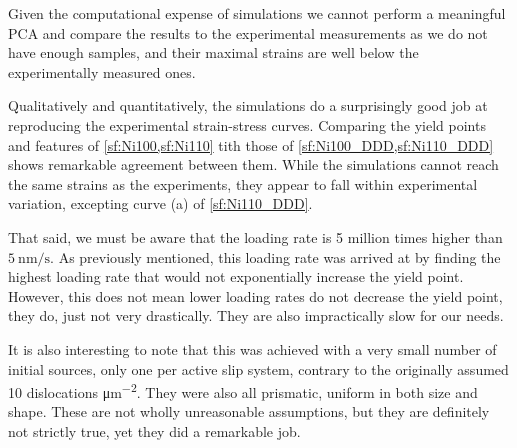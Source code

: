 Given the computational expense of simulations we cannot perform a meaningful PCA and compare the results to the experimental measurements as we do not have enough samples, and their maximal strains are well below the experimentally measured ones.

Qualitatively and quantitatively, the simulations do a surprisingly good job at reproducing the experimental strain-stress curves. Comparing the yield points and features of \cref{sf:Ni100,sf:Ni110} tith those of \cref{sf:Ni100_DDD,sf:Ni110_DDD} shows remarkable agreement between them. While the simulations cannot reach the same strains as the experiments, they appear to fall within experimental variation, excepting curve (a) of \cref{sf:Ni110_DDD}.

That said, we must be aware that the loading rate is 5 million times higher than $\SI{5}{\nano\meter\per\second}$. As previously mentioned, this loading rate was arrived at by finding the highest loading rate that would not exponentially increase the yield point. However, this does not mean lower loading rates do not decrease the yield point, they do, just not very drastically. They are also impractically slow for our needs.

It is also interesting to note that this was achieved with a very small number of initial sources, only one per active slip system, contrary to the originally assumed 10 dislocations \si{\micro\metre^{-2}}. They were also all prismatic, uniform in both size and shape. These are not wholly unreasonable assumptions, but they are definitely not strictly true, yet they did a remarkable job.

